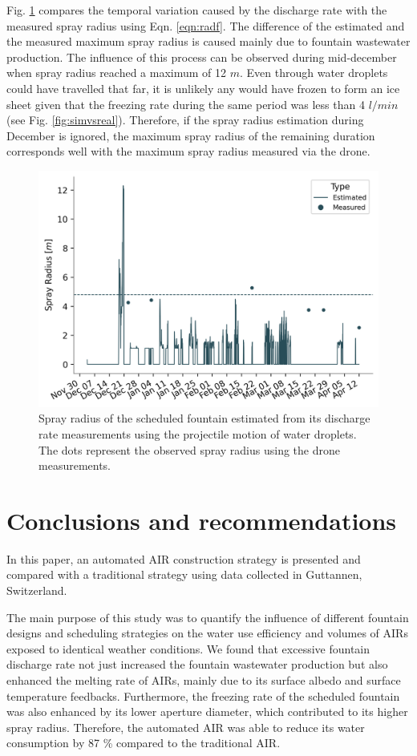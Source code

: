 \documentclass[tc, manuscript]{copernicus}
\begin{document}
Fig. \ref{fig:radf} compares the temporal variation caused by the discharge rate with the measured spray radius
using Eqn. \ref{eqn:radf}. The difference of the estimated and the measured maximum spray radius is caused
mainly due to fountain wastewater production. The influence of this process can be observed during mid-december
when spray radius reached a maximum of 12 $m$. Even through water droplets could have travelled that far, it is
unlikely any would have frozen to form an ice sheet given that the freezing rate during the same period was less
than 4 $l/min$ (see Fig. \ref{fig:simvsreal}). Therefore, if the spray radius estimation during December is
ignored, the maximum spray radius of the remaining duration corresponds well with the maximum spray radius
measured via the drone.

\begin{figure}[t]
\includegraphics[width=12cm]{Figures/radf.png}

\caption{ Spray radius of the scheduled fountain estimated from its discharge rate measurements using the
projectile motion of water droplets. The dots represent the observed spray radius using the drone measurements.
}

\label{fig:radf}
\end{figure}

\section{Conclusions and recommendations}

In this paper, an automated AIR construction strategy is presented and compared with a traditional strategy
using data collected in Guttannen, Switzerland.

The main purpose of this study was to quantify the influence of different fountain designs and scheduling
strategies on the water use efficiency and volumes of AIRs exposed to identical weather conditions. We found
that excessive fountain discharge rate not just increased the fountain wastewater production but also enhanced
the melting rate of AIRs, mainly due to its surface albedo and surface temperature feedbacks. Furthermore, the
freezing rate of the scheduled fountain was also enhanced by its lower aperture diameter, which contributed to
its higher spray radius. Therefore, the automated AIR was able to reduce its water consumption by 87 \% compared
to the traditional AIR.
\end{document}
